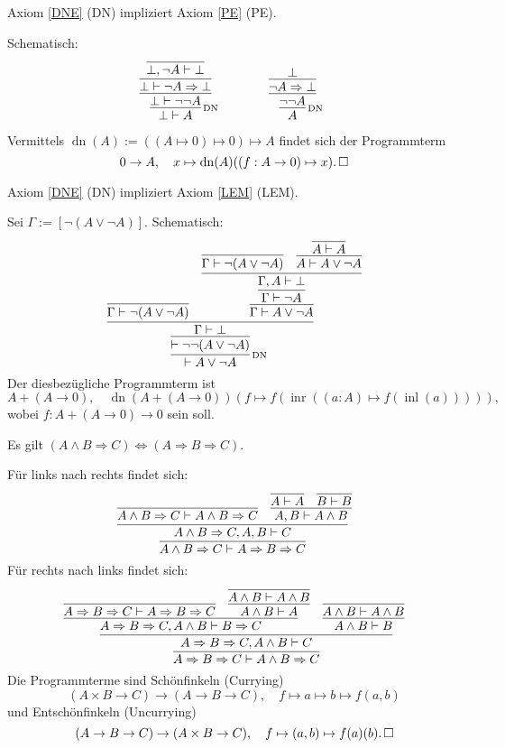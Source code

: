 \begin{Satz}
Axiom \ref{DNE} (DN) impliziert
Axiom \ref{PE} (PE).
\end{Satz}
\begin{Beweis}[Beweis]
Schematisch:
\[
\begin{array}{@{}l@{\qquad\qquad}l}
\infer[\infernote{DN}]{\bot\vdash A}{
  \infer{\bot\vdash\neg\neg A}{
    \infer{\bot\vdash \neg A\Rightarrow\bot}{
      \infer{\bot,\neg A\vdash\bot}{}}}}
&
\infer[\infernote{DN}]{A}{
  \infer{\neg\neg A}{
    \infer{\neg A\Rightarrow\bot}{\bot}}}
\end{array}
\]
Vermittels $\operatorname{dn}(A):=((A\mapsto 0)\mapsto 0)\mapsto A$
findet sich der Programmterm
\[0\to A,\quad x\mapsto \operatorname{dn}(A)((f: A\to 0)\mapsto x).
\,\square\]
\end{Beweis}

\begin{Satz}
Axiom \ref{DNE} (DN) impliziert Axiom \ref{LEM} (LEM).
\end{Satz}
\begin{Beweis}[Beweis]
Sei $\Gamma:=[\neg (A\lor\neg A)]$. Schematisch:
\[\infer[\infernote{DN}]{\vdash A\lor\neg A}{
  \infer{\vdash\neg\neg (A\lor\neg A)}{
    \infer{\Gamma\vdash\bot}{
      \infer{\Gamma\vdash\neg (A\lor\neg A)}{}
    & \infer{\Gamma\vdash A\lor\neg A}{
        \infer{\Gamma\vdash\neg A}{
          \infer{\Gamma,A\vdash\bot}{
            \infer{\Gamma\vdash\neg (A\lor\neg A)}{}
          & \infer{A\vdash A\lor\neg A}{\infer{A\vdash A}{}}}}}}}}
\]
Der diesbezügliche Programmterm ist
\[A + (A\to 0),\quad
\operatorname{dn}(A + (A\to 0))(
  f\mapsto f(\operatorname{inr}((a: A)\mapsto f(\operatorname{inl}(a))))
),\]
wobei $f\colon A + (A \to 0)\to 0$ sein soll.\,\qedsymbol
\end{Beweis}

\begin{Satz}\label{curry-impl}
Es gilt $(A\land B\Rightarrow C)\Leftrightarrow (A\Rightarrow B\Rightarrow C)$.
\end{Satz}
\begin{Beweis}
Für links nach rechts findet sich:
\[
\infer{A\land B\Rightarrow C\vdash A\Rightarrow B\Rightarrow C}{
  \infer{A\land B\Rightarrow C, A, B\vdash C}{
    \infer{A\land B\Rightarrow C\vdash A\land B\Rightarrow C}{}
  & \infer{A, B\vdash A\land B}{
      \infer{A\vdash A}{} & \infer{B\vdash B}{}}}}
\]
Für rechts nach links findet sich:
\[
\infer{A\Rightarrow B\Rightarrow C\vdash A\land B\Rightarrow C}{
  \infer{A\Rightarrow B\Rightarrow C, A\land B\vdash C}{
    \infer{A\Rightarrow B\Rightarrow C, A\land B\vdash B\Rightarrow C}{
      \infer{A\Rightarrow B\Rightarrow C\vdash A\Rightarrow B\Rightarrow C}{}
    & \infer{A\land B\vdash A}{\infer{A\land B\vdash A\land B}{}}}
  & \infer{A\land B\vdash B}{\infer{A\land B\vdash A\land B}{}}}}
\]
Die Programmterme sind Schönfinkeln (Currying)
\[(A\times B\to C)\to (A\to B\to C),\quad
f\mapsto a\mapsto b\mapsto f(a,b)\]
und Entschönfinkeln (Uncurrying)
\[(A\to B\to C)\to (A\times B\to C),\quad
f\mapsto (a, b)\mapsto f(a)(b).\,\square\]
\end{Beweis}

